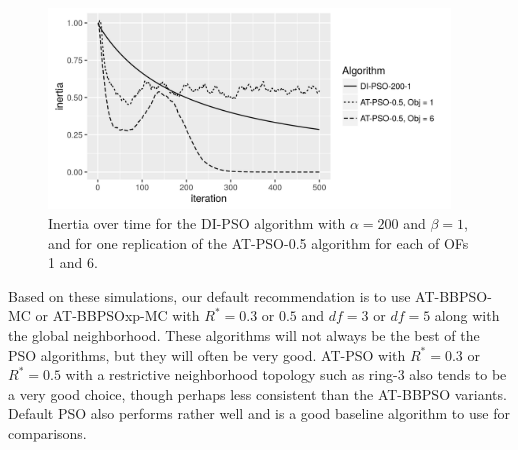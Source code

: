 \documentclass[12pt]{article}
\begin{document}
\begin{figure}[!ht]
\centering
\includegraphics[width=0.95\textwidth]{code/psosims/inertiaplot.png}
\caption{Inertia over time for the DI-PSO algorithm with $\alpha=200$ and $\beta=1$, and for one replication of the AT-PSO-0.5 algorithm for each of OFs 1 and 6.}
\label{fig:inertia}
\end{figure}


Based on these simulations, our default recommendation is to use AT-BBPSO-MC or AT-BBPSOxp-MC with $R^*=0.3$ or $0.5$ and $df=3$ or $df=5$ along with the global neighborhood. These algorithms will not always be the best of the PSO algorithms, but they will often be very good. AT-PSO with $R^*=0.3$ or $R^*=0.5$ with a restrictive neighborhood topology such as ring-3 also tends to be a very good choice, though perhaps less consistent than the AT-BBPSO variants. Default PSO also performs rather well and is a good baseline algorithm to use for comparisons.
\end{document}
